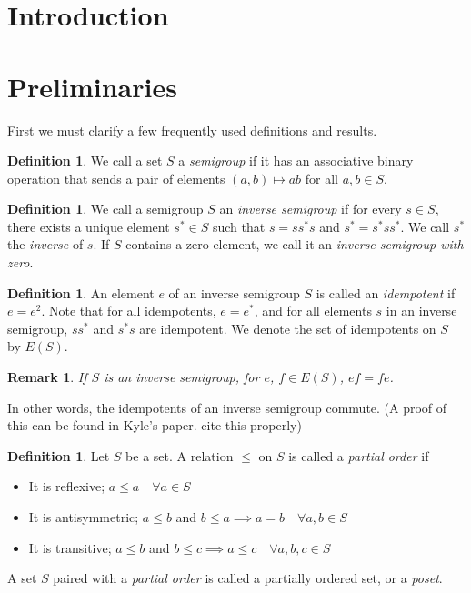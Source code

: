 \documentclass{article}
\newtheorem{remark}[theorem]{Remark}
\theoremstyle{definition}
\newtheorem{definition}[theorem]{Definition}
\begin{document}
\section{Introduction}
\section{Preliminaries}
First we must clarify a few frequently used definitions and results.

\begin{definition}
    We call a set $S$ a \textit{semigroup} if it has an associative binary operation
    that sends a pair of elements $(a, b) \mapsto ab$ for all $a, b \in S$.
\end{definition}

\begin{definition}
    We call a semigroup $S$ an \textit{inverse semigroup} if for every $s \in S$, there exists a unique
    element $s^* \in S$ such that $s = ss^*s$ and $s^* = s^*ss^*$. We call $s^*$ the \textit{inverse} of $s$.
    If $S$ contains a zero element, we call it an \textit{inverse semigroup with zero}.
\end{definition}

\begin{definition}
    An element $e$ of an inverse semigroup $S$ is called an \textit{idempotent} if
    $e = e^2$. Note that for all idempotents, $e = e^*$, and for all elements $s$ in
    an inverse semigroup, $ss^*$ and $s^*s$ are idempotent. We denote the set of idempotents
    on $S$ by $E(S)$.
\end{definition}

\begin{remark}
    If $S$ is an inverse semigroup, for $e$, $f \in E(S)$, $ef = fe$.
\end{remark}
In other words, the idempotents of an inverse semigroup commute. (A proof of this can be found in Kyle's paper. cite this properly)

\begin{definition}
    Let $S$ be a set. A relation $\leq$ on $S$ is called a \textit{partial order} if
    \begin{itemize}
        \item It is reflexive; $a \leq a \quad \forall a \in S$
        \item It is antisymmetric; $a \leq b$ and $b \leq a \implies a = b \quad \forall a, b \in S$
        \item It is transitive; $a \leq b$ and $b \leq c \implies a \leq c \quad \forall a, b, c \in S$
    \end{itemize}
    A set $S$ paired with a \textit{partial order} is called a partially ordered set, or a \textit{poset}.
\end{definition}
\end{document}
